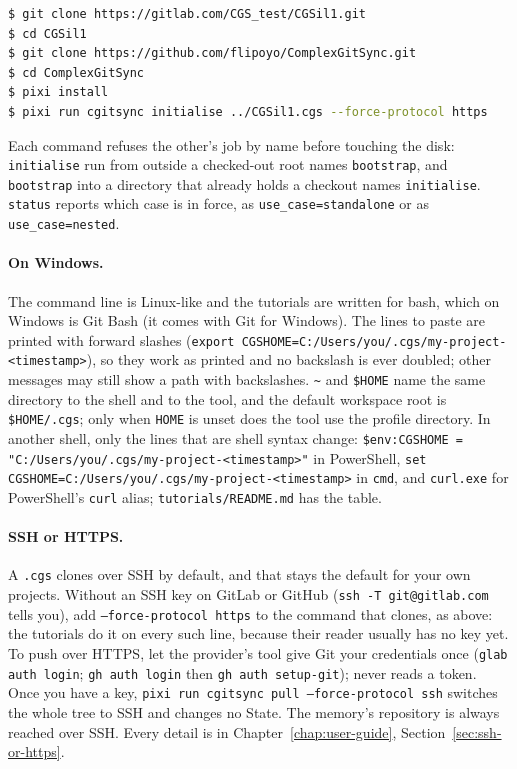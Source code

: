 \begin{lstlisting}[language=bash]
$ git clone https://gitlab.com/CGS_test/CGSil1.git
$ cd CGSil1
$ git clone https://github.com/flipoyo/ComplexGitSync.git
$ cd ComplexGitSync
$ pixi install
$ pixi run cgitsync initialise ../CGSil1.cgs --force-protocol https
\end{lstlisting}

Each command refuses the other's job by name before touching the disk:
\texttt{initialise} run from outside a checked-out root names
\texttt{bootstrap}, and \texttt{bootstrap} into a directory that already holds
a checkout names \texttt{initialise}. \texttt{status} reports which case is
in force, as \texttt{use\_case=standalone} or as
\texttt{use\_case=nested}.

\paragraph{On Windows.} The command line is Linux-like and the tutorials are
written for bash, which on Windows is Git Bash (it comes with Git for
Windows). The lines to paste are printed with forward slashes
(\texttt{export CGSHOME=C:/Users/you/.cgs/my-project-<timestamp>}), so they
work as printed and no backslash is ever doubled; other messages may still
show a path with backslashes. \texttt{\textasciitilde}
and \texttt{\$HOME} name the same directory to the shell and to the tool,
and the default workspace root is \texttt{\$HOME/.cgs}; only when
\texttt{HOME} is unset does the tool use the profile directory. In another
shell, only the lines that are shell syntax change:
\texttt{\$env:CGSHOME = "C:/Users/you/.cgs/my-project-<timestamp>"} in
PowerShell, \texttt{set CGSHOME=C:/Users/you/.cgs/my-project-<timestamp>} in
\texttt{cmd}, and \texttt{curl.exe} for PowerShell's \texttt{curl} alias;
\texttt{tutorials/README.md} has the table.

\paragraph{SSH or HTTPS.} A \texttt{.cgs} clones over SSH by default, and
that stays the default for your own projects. Without an SSH key on GitLab or
GitHub (\texttt{ssh -T git@gitlab.com} tells you), add
\texttt{--force-protocol https} to the command that clones, as above: the
tutorials do it on every such line, because their reader usually has no key
yet. To push over HTTPS, let the provider's tool give Git your credentials
once (\texttt{glab auth login}; \texttt{gh auth login} then \texttt{gh auth
setup-git}); \cgscli{} never reads a token. Once you have a key,
\texttt{pixi run cgitsync pull --force-protocol ssh} switches the whole tree
to SSH and changes no State. The memory's repository is always reached over
SSH. Every detail is in Chapter~\ref{chap:user-guide}, Section~\ref{sec:ssh-or-https}.

